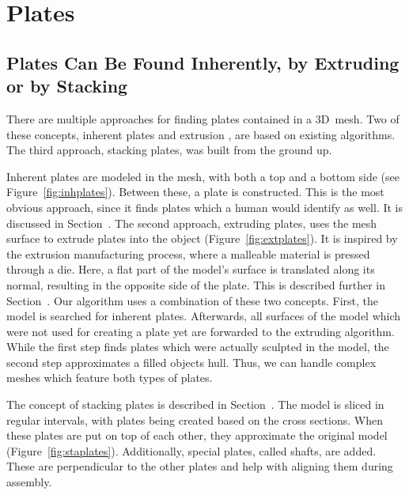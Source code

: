 \documentclass[../ClassicThesis.tex]{subfiles}
\begin{document}
\chapter{Plates}\label{ch:plates}

\section{Plates Can Be Found Inherently, by Extruding or by Stacking}

There are multiple approaches for finding plates contained in a 3D~mesh. Two of these concepts, inherent plates \cite[p.~32]{master-thesis} and extrusion \cite[p.~28]{master-thesis}, are based on existing algorithms. The third approach, stacking plates, was built from the ground up.

Inherent plates are modeled in the mesh, with both a top and a bottom side (see Figure~\ref{fig:inhplates}). Between these, a plate is constructed. This is the most obvious approach, since it finds plates which a human would identify as well. It is discussed in Section~. The second approach, extruding plates, uses the mesh surface to extrude plates into the object (Figure~\ref{fig:extplates}). It is inspired by the extrusion manufacturing process, where a malleable material is pressed through a die. Here, a flat part of the model's surface is translated along its normal, resulting in the opposite side of the plate. This is described further in Section~. Our algorithm uses a combination of these two concepts. First, the model is searched for inherent plates. Afterwards, all surfaces of the model which were not used for creating a plate yet are forwarded to the extruding algorithm. While the first step finds plates which were actually sculpted in the model, the second step approximates a filled objects hull. Thus, we can handle complex meshes which feature both types of plates. 

The concept of stacking plates is described in Section~. The model is sliced in regular intervals, with plates being created based on the cross sections. When these plates are put on top of each other, they approximate the original model (Figure~\ref{fig:staplates}). Additionally, special plates, called shafts, are added. These are perpendicular to the other plates and help with aligning them during assembly.
\end{document}
